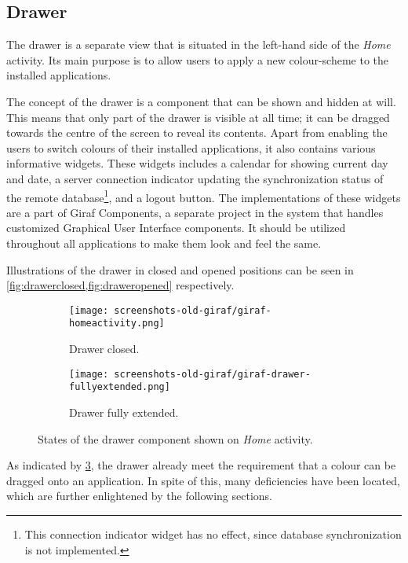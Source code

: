 \subsection{Drawer}\label{sec:launcher:drawer}
The drawer is a separate view that is situated in the left-hand side of the \textit{Home} activity.
Its main purpose is to allow \launcher users to apply a new colour-scheme to the installed \giraf applications.

The concept of the drawer is a component that can be shown and hidden at will.
This means that only part of the drawer is visible at all time; it can be dragged towards the centre of the screen to reveal its contents.
Apart from enabling the users to switch colours of their installed \giraf applications, it also contains various informative widgets.
These widgets includes a calendar for showing current day and date, a server connection indicator updating the synchronization status of the remote database\footnote{This connection indicator widget has no effect, since database synchronization is not implemented.}, and a logout button.
The implementations of these widgets are a part of Giraf Components, a separate project in the \giraf system that handles customized Graphical User Interface components.
It should be utilized throughout all \giraf applications to make them look and feel the same.

Illustrations of the drawer in closed and opened positions can be seen in \cref{fig:drawerclosed,fig:draweropened} respectively.

\begin{figure}[h] %
\centering
	\begin{subfigure}[b]{.48\textwidth}
	\centering
	\texttt{[image: screenshots-old-giraf/giraf-homeactivity.png]}
	\caption{Drawer closed.}
	\label{fig:drawerclosed}
	\end{subfigure}
	\hfill
	\begin{subfigure}[b]{.48\textwidth}
	\centering
	\texttt{[image: screenshots-old-giraf/giraf-drawer-fullyextended.png]}
	\caption{Drawer fully extended.}
	\label{fig:draweropened}
	\end{subfigure}
\caption{States of the drawer component shown on \textit{Home} activity.}
\label{fig:drawerstates}
\end{figure}

As indicated by \cref{fig:drawerstates}, the drawer already meet the requirement that a colour can be dragged onto an application.
In spite of this, many deficiencies have been located, which are further enlightened by the following sections.

